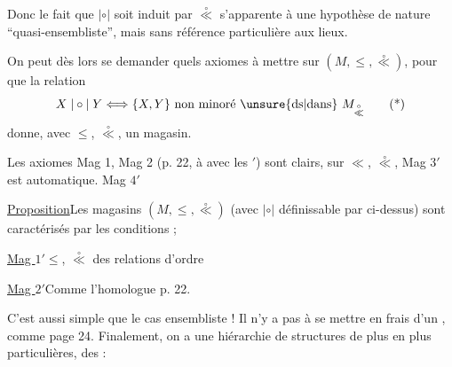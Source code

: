 Donc le fait que $\mathrel{|\circ|}$ soit induit par $\overset{\circ}{\ll}$ s'apparente à une hypothèse de nature ``quasi-ensembliste'', mais sans référence particulière aux lieux.

On peut dès lors se demander quels axiomes à mettre sur $(M,\leq,\overset{\circ}{\ll})$, pour que la relation
\[
X\mathrel{|\circ|}Y\Longleftrightarrow\{X,Y\}\text{ non minoré \unsure{ds|dans} }M_{\overset{\circ}{\ll}}\tag*{(*)}
\]
 donne, avec $\leq$, $\overset{\circ}{\ll}$, un magasin.

Les axiomes Mag 1, Mag 2 (p. 22, à   avec les $'$) sont clairs,  sur $\ll$, $\overset{\circ}{\ll}$, \deleted{\unsure{\&}} Mag $3'$ est automatique. Mag $4'$  


\uline{Proposition}\quad Les magasins $(M,\leq,\overset{\circ}{\ll})$ (avec $\mathrel{|\circ|}$ définissable par \unsure{(*)} ci-dessus) sont caractérisés par les conditions ;

\uline{Mag $1'$}\quad $\leq$, $\overset{\circ}{\ll}$ des relations d'ordre

\uline{Mag $2'$}\quad Comme l'homologue p. 22.

\quad{}

C'est  aussi simple que le cas ensembliste ! Il n'y a pas à se mettre en frais d'un , comme page 24. Finalement, on a une hiérarchie de structures de plus en plus particulières, des  :

